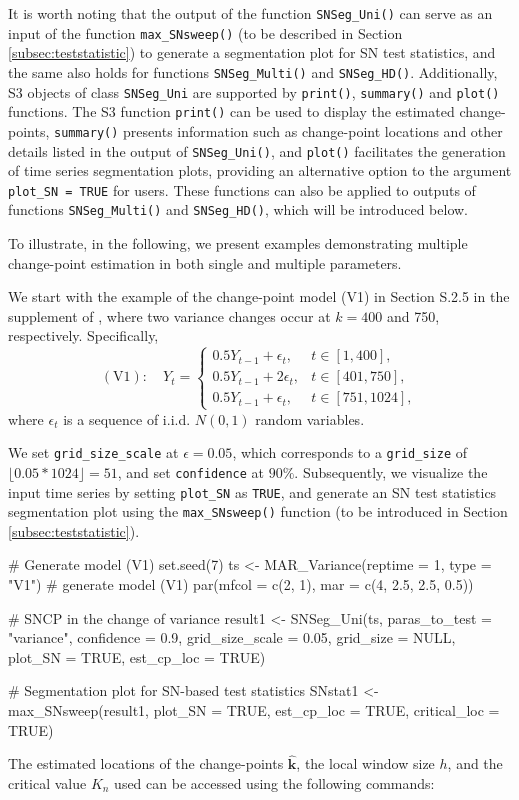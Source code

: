 It is worth noting that the output of the function \texttt{SNSeg\_Uni()} can  serve as an input of the function \texttt{max\_SNsweep()} (to be described in Section \ref{subsec:teststatistic}) to generate a segmentation plot for SN test statistics, and the same also holds for functions \texttt{SNSeg\_Multi()} and \texttt{SNSeg\_HD()}. 
{Additionally, S3 objects of class \texttt{SNSeg\_Uni} are supported by  \texttt{print()},  \texttt{summary()} and \texttt{plot()} functions. The S3 function \texttt{print()} can be used to display the estimated change-points,   \texttt{summary()} presents information such as change-point locations and other details listed in the output of \texttt{SNSeg\_Uni()}, and \texttt{plot()} facilitates the generation of time series segmentation plots, providing an alternative option to the argument \texttt{plot\_SN = TRUE} for users. These functions can also be applied to outputs of functions \texttt{SNSeg\_Multi()} and \texttt{SNSeg\_HD()}, which will be introduced below.}


To illustrate, in the following, we present examples demonstrating multiple change-point estimation in both single and multiple parameters. 


We start with the example of the change-point model (V1) in Section S.2.5 in the supplement of \cite{zhao2021segmenting}, where two variance changes occur at  $k=400$ and 750, respectively. Specifically, $$
(\mathrm{V} 1): \quad Y_t= \begin{cases}0.5 Y_{t-1}+\epsilon_t, & t \in[1,400], \\ 0.5 Y_{t-1}+2 \epsilon_t, & t \in[401,750], \\ 0.5 Y_{t-1}+\epsilon_t, & t \in[751,1024],\end{cases}
$$
where $\epsilon_t$ is a sequence of i.i.d. $N(0,1)$ random variables.

We set \texttt{grid\_size\_scale} at $\epsilon=0.05$, which corresponds to a \texttt{grid\_size} of $\lfloor 0.05*1024\rfloor=51$, and set \texttt{confidence} at $90\%$. Subsequently, we visualize the input time series by setting \texttt{plot\_SN} as \texttt{TRUE}, and generate an SN test statistics segmentation plot using the \texttt{max\_SNsweep()} function (to be introduced in Section \ref{subsec:teststatistic}). 

\begin{example}
# Generate model (V1)
set.seed(7)
ts <- MAR_Variance(reptime = 1, type = "V1") # generate model (V1)
par(mfcol = c(2, 1), mar = c(4, 2.5, 2.5, 0.5))

# SNCP in the change of variance
result1 <- SNSeg_Uni(ts, paras_to_test = "variance", confidence = 0.9,
                     grid_size_scale = 0.05, grid_size = NULL, plot_SN = TRUE, 
                     est_cp_loc = TRUE)

# Segmentation plot for SN-based test statistics
SNstat1 <- max_SNsweep(result1, plot_SN = TRUE, est_cp_loc = TRUE, critical_loc = TRUE)
\end{example}
The estimated locations of the change-points $\widehat{\mathbf k}$, the local window size $h$, and the critical value $K_n$ used can be accessed using the following commands:

